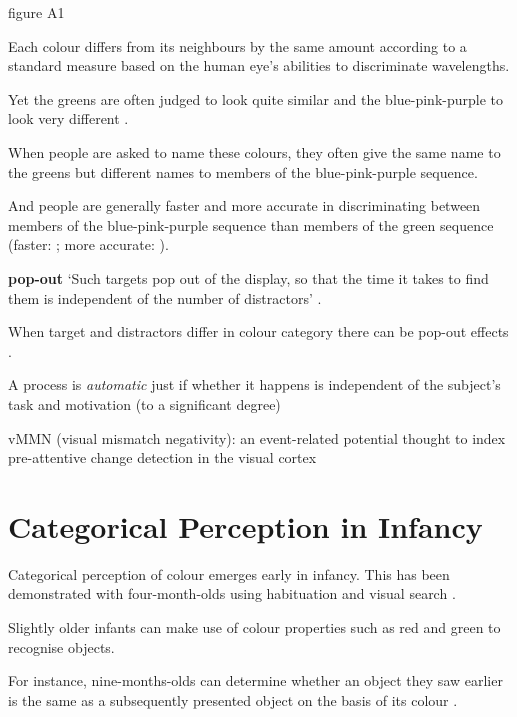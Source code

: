 \documentclass[12pt]{extarticle}
\begin{document}
\begin{multicols}{3}
\begin{center}
\end{center}


\begin{center} \citealp{Daoutis:2006ij} figure A1 \end{center}

Each colour differs from its neighbours by the same amount according to a standard measure based on the human eye's abilities to discriminate wavelengths.

Yet the greens are often judged to look quite similar and the blue-pink-purple to look very different \citep[p.\ 12--7]{Roberson:1999rk}.


When people are asked to name these colours, they often give the same name to the greens but different names to members of the blue-pink-purple sequence.


And people are generally faster and more accurate in discriminating between members of the blue-pink-purple sequence than members of the green sequence (faster: \citealp{Bornstein:1984cb}; more accurate: \citealp[p.\ 22--7]{Roberson:1999rk}).

\textbf{pop-out} ‘Such targets pop out of the display, so that the time it takes to find them is independent of the number of distractors’ \citep[p.\ 117]{Treisman:1986pm}.

When target and distractors differ in colour category there can be pop-out effects \citep{Daoutis:2006qk}.

A process is \emph{automatic} just if
whether it happens is independent of the subject’s task and motivation (to a significant degree)

vMMN (visual mismatch negativity): an event-related potential  thought to index pre-attentive change detection in the visual cortex




\section{Categorical Perception in Infancy}

Categorical perception of colour emerges early in infancy.  This has been demonstrated with four-month-olds using habituation \citep{Bornstein:1976of} and visual search \citep{Franklin:2005xk}.

Slightly older infants can make use of colour properties such as red and green to recognise objects.

For instance, nine-months-olds can determine whether an object they saw earlier is the same as a subsequently presented object on the basis of its colour \citep{Wilcox:2008jk}.


\end{multicols}
\end{document}
